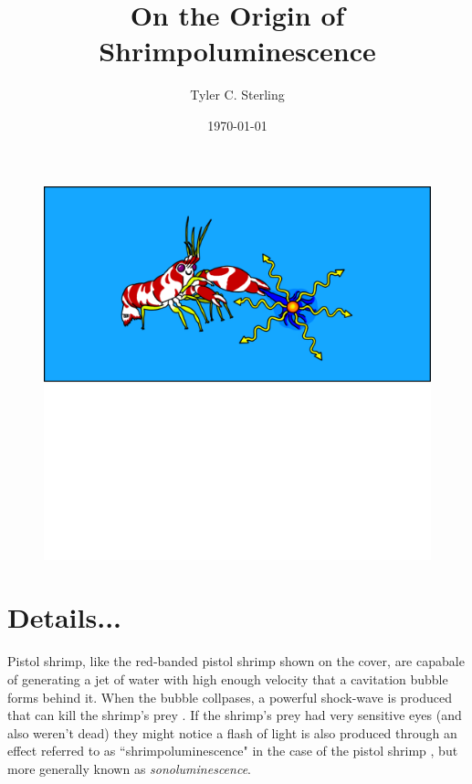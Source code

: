 \documentclass[prl,aps,11pt,superscriptaddress,floatfix]{revtex4-2}
\begin{document}
\title{\huge On the Origin of Shrimpoluminescence }

\author{\large Tyler C. Sterling}

\date{\today}


\maketitle



\begin{figure}
\includegraphics[width=1\linewidth]{../figs/shrimpy2.pdf}
\label{fig:shrimpy}
\end{figure}
 
\newpage

\section{Details...}
Pistol shrimp, like the red-banded pistol shrimp shown on the cover, are capabale of generating a jet of water with high enough velocity that a cavitation bubble forms behind it. When the bubble collpases, a powerful shock-wave is produced that can kill the shrimp's prey \cite{versluis2000snapping}. If the shrimp's prey had very sensitive eyes (and also weren't dead) they might notice a flash of light is also produced through an effect referred to as ``shrimpoluminescence" in the case of the pistol shrimp \cite{lohse2001snapping}, but more generally known as \emph{sonoluminescence}.
\end{document}
